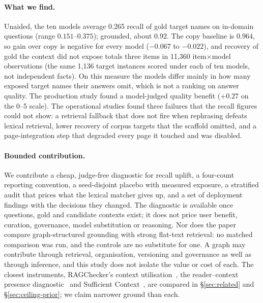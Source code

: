 \documentclass[10pt,twocolumn]{article}
\begin{document}
\paragraph{What we find.} Unaided, the ten models average 0.265 recall of gold target names on in-domain questions (range $0.151$--$0.375$); grounded, about $0.92$. The copy baseline is $0.964$, so gain over copy is negative for every model ($-0.067$ to $-0.022$), and recovery of gold the context did not expose totals three items in 11{,}360 item$\times$model observations (the same 1{,}136 target instances scored under each of ten models, not independent facts). On this measure the models differ mainly in how many exposed target names their answers omit, which is not a ranking on answer quality. The production study found a model-judged quality benefit ($+0.27$ on the 0--5 scale). The operational studies found three failures that the recall figures could not show: a retrieval fallback that does not fire when rephrasing defeats lexical retrieval, lower recovery of corpus targets that the scaffold omitted, and a page-integration step that degraded every page it touched and was disabled.

\paragraph{Bounded contribution.} We contribute a cheap, judge-free diagnostic for recall uplift, a four-count reporting convention, a seed-disjoint placebo with measured exposure, a stratified audit that prices what the lexical matcher gives up, and a set of deployment findings with the decisions they changed. The diagnostic is available once questions, gold and candidate contexts exist; it does not price user benefit, curation, governance, model substitution or reasoning. Nor does the paper compare graph-structured grounding with strong flat-text retrieval: no matched comparison was run, and the controls are no substitute for one. A graph may contribute through retrieval, organisation, versioning and governance as well as through inference, and this study does not isolate the value or cost of each. The closest instruments, RAGChecker's context utilisation~\cite{ragchecker2024}, the reader--context presence diagnostic~\cite{readercontext2026} and Sufficient Context~\cite{sufficientcontext2025}, are compared in \S\ref{sec:related} and \S\ref{sec:ceiling-prior}; we claim narrower ground than each.
\end{document}
